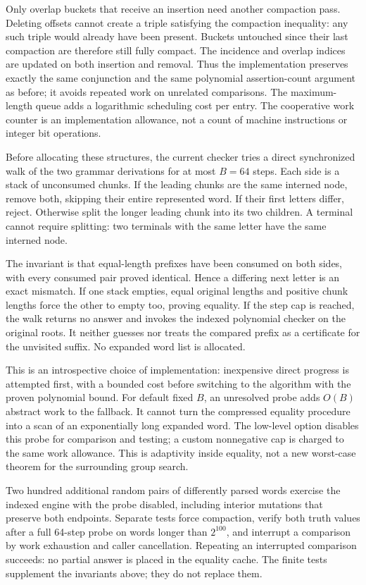 Only overlap buckets that receive an insertion need another compaction
pass. Deleting offsets cannot create a triple satisfying the compaction
inequality: any such triple would already have been present. Buckets
untouched since their last compaction are therefore still fully compact.
The incidence and overlap indices are updated on both insertion and
removal. Thus the implementation preserves exactly the same conjunction
and the same polynomial assertion-count argument as before; it avoids
repeated work on unrelated comparisons. The maximum-length queue adds a
logarithmic scheduling cost per entry. The cooperative work counter is an
implementation allowance, not a count of machine instructions or integer
bit operations.

Before allocating these structures, the current checker tries a direct
synchronized walk of the two grammar derivations for at most $B=64$
steps. Each side is a stack of unconsumed chunks. If the leading chunks
are the same interned node, remove both, skipping their entire represented
word. If their first letters differ, reject. Otherwise split the longer
leading chunk into its two children. A terminal cannot require splitting:
two terminals with the same letter have the same interned node.

The invariant is that equal-length prefixes have been consumed on both
sides, with every consumed pair proved identical. Hence a differing next
letter is an exact mismatch. If one stack empties, equal original lengths
and positive chunk lengths force the other to empty too, proving equality.
If the step cap is reached, the walk returns no answer and invokes the
indexed polynomial checker on the original roots. It neither guesses nor
treats the compared prefix as a certificate for the unvisited suffix.
No expanded word list is allocated.

This is an introspective choice of implementation: inexpensive direct
progress is attempted first, with a bounded cost before switching to the
algorithm with the proven polynomial bound. For default fixed $B$, an
unresolved probe adds $O(B)$ abstract work to the fallback. It cannot turn
the compressed equality procedure into a scan of an exponentially long
expanded word. The low-level option 
disables this probe for comparison and testing; a custom nonnegative cap
is charged to the same work allowance. This is adaptivity inside equality,
not a new worst-case theorem for the surrounding group search.

Two hundred additional random pairs of differently parsed words exercise
the indexed engine with the probe disabled, including interior mutations
that preserve both endpoints. Separate tests force compaction, verify both
truth values after a full 64-step probe on words longer than $2^{100}$,
and interrupt a comparison by work exhaustion and caller cancellation.
Repeating an interrupted comparison succeeds: no partial answer is placed
in the equality cache. The finite tests supplement the invariants above;
they do not replace them.


